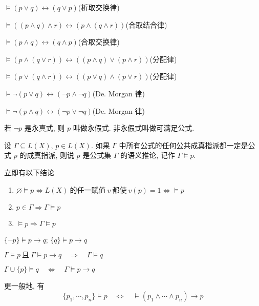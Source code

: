 \documentclass[
    mode=hazy,
    color=blue,
    device=normal,
    lang=cn
]{elegantnote}
\begin{document}
$\vDash (p\lor q)\leftrightarrow(q\lor p)$\hfill(析取交换律)

$\vDash ((p\land q)\land r)\leftrightarrow(p\land(q\land r))$\hfill(合取结合律)

$\vDash (p\land q)\leftrightarrow(q\land p)$\hfill(合取交换律)

$\vDash (p\land(q\lor r))\leftrightarrow((p\land q)\lor(p\land r))$\hfill(分配律)

$\vDash (p\lor (q\land r))\leftrightarrow((p\lor q)\land (p\lor r))$\hfill(分配律)

$\vDash \lnot(p\lor q)\leftrightarrow(\lnot p\land\lnot q)$\hfill(De. Morgan 律)

$\vDash \lnot(p\land q)\leftrightarrow(\lnot p\lor\lnot q)$\hfill(De. Morgan 律)

\begin{definition}[永假式与可满足公式]
    若 $\lnot p$ 是永真式, 则 $p$ 叫做永假式. 非永假式叫做可满足公式.
\end{definition}
\begin{definition}[语义推论]
    设 $\Gamma \subseteq L(X)$, $p\in L(X)$. 如果 $\Gamma$ 中所有公式的任何公共成真指派都一定是公式 $p$ 的成真指派, 则说 $p$ 是公式集 $\Gamma$ 的语义推论, 记作 $\Gamma\vDash p$.
\end{definition}
立即有以下结论
\begin{enumerate}[label = $\arabic*^\circ$, topsep = -1em]
    \item $\varnothing\vDash p\Leftrightarrow L(X)\ \text{的任一赋值}\ v\ \text{都使}\ v(p)=1\Leftrightarrow\vDash p$
    \item $p\in\Gamma\Rightarrow\Gamma\vDash p$
    \item $\vDash p\Rightarrow\Gamma\vDash p$
\end{enumerate}
\begin{proposition}
    $\{\lnot p\}\vDash p\to q$; $\{q\}\vDash p\to q$
\end{proposition}
\begin{proposition}
    $\Gamma\vDash p\ \text{且}\ \Gamma\vDash p\to q\quad\Rightarrow\quad\Gamma\vDash q$
\end{proposition}
\begin{proposition}[语义演绎定理]
    $\Gamma\cup\{p\}\vDash q\quad\Leftrightarrow\quad\Gamma\vDash p\to q$
\end{proposition}
更一般地, 有
$$
    \{p_1,\cdots,p_n\}\vDash p\quad\Leftrightarrow\quad \vDash(p_1\land\cdots\land p_n)\to p
$$
\end{document}
